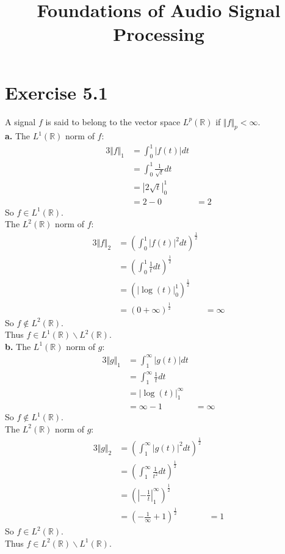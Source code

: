 \documentclass[12pt]{article}
\title{Foundations of Audio Signal Processing\\ \ass}
\author{\auth}
\newcommand{\real}{\mathbb{R}}
\newcommand{\liup}{\ensuremath{1}}
\newcommand{\lido}{\ensuremath{0}}
\newcommand{\liiup}{\ensuremath{\infty}}
\newcommand{\liido}{\ensuremath{1}}
\begin{document}
	\maketitle
	\section*{Exercise 5.1}
	A signal $f$ is said to belong to the vector space $L^p(\real)$ if $\Vert f \Vert_p < \infty$.\\
	\textbf{a.} The $L^1(\real)$ norm of $f$:
	\begin{alignat*}{3}
	\Vert f \Vert_1 &= \int_{\lido}^{\liup} \vert f(t) \vert dt\\
	&= \int_{\lido}^{\liup} \frac{1}{\sqrt{t}} dt\\
	&= \left| 2\sqrt{t} \right|^{\liup}_{\lido}\\
	&= 2 - 0 &= 2
	\end{alignat*}
	So $f \in L^1(\real)$.\\
	The $L^2(\real)$ norm of $f$:
	\begin{alignat*}{3}
	\Vert f \Vert_2 &= \left(\int_{\lido}^{\liup} \vert f(t) \vert^2 dt\right)^\frac{1}{2}\\
	&= \left(\int_{\lido}^{\liup} \frac{1}{t} dt\right)^\frac{1}{2}\\
	&= \left(\left| \log(t) \right|^\liup_{\lido}\right)^\frac{1}{2}\\
	&= \left(0 + \infty \right)^\frac{1}{2} &= \infty
	\end{alignat*}
	So $f \notin L^2(\real)$.\\
	Thus $f \in L^1(\real) \backslash L^2(\real)$.\\
	
	\textbf{b.} The $L^1(\real)$ norm of $g$:
	\begin{alignat*}{3}
	\Vert g \Vert_1 &= \int_{\liido}^{\liiup} \vert g(t) \vert dt\\
	&= \int_{\liido}^{\liiup} \frac{1}{t} dt\\
	&= \left| \log(t) \right|^\liiup_{\liido} \\
	&= \infty  - 1 &= \infty
	\end{alignat*}
	So $f \notin L^1(\real)$.\\
	The $L^2(\real)$ norm of $g$:
	\begin{alignat*}{3}
	\Vert g \Vert_2 &= \left(\int_{\liido}^{\liiup} \vert g(t) \vert^2 dt\right)^\frac{1}{2}\\
	&= \left(\int_{\liido}^{\liiup} \frac{1}{t^2} dt\right)^\frac{1}{2}\\
	&= \left(\left| -\frac{1}{t} \right|^\infty_{\liido}\right)^\frac{1}{2}\\
	&= \left(-\frac{1}{\infty} + 1\right)^\frac{1}{2} &= 1
	\end{alignat*}
	So $f \in L^2(\real)$.\\
	Thus $f \in L^2(\real) \backslash L^1(\real)$.
	
\end{document}
